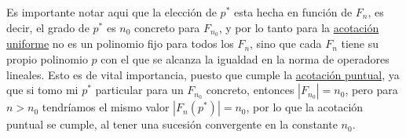 \begin{ejercicio}
    \noindent
    Es importante notar aqui que la elección de $p^*$ esta hecha en función de $F_n$, es decir, el grado de $p^*$ es $n_0$ concreto para $F_{n_0}$, y por lo tanto para la \underline{acotación uniforme} no es un polinomio fijo para todos los $F_n$, sino que cada $F_n$ tiene su propio polinomio $p$ con el que se alcanza la igualdad en la norma de operadores lineales. Esto es de vital importancia, puesto que  cumple la \underline{acotación puntual}, ya que si tomo mi $p^*$ particular para un $F_{n_0}$ concreto, entonces $|F_{n_0}|=n_0$, pero para $n>n_0$ tendríamos el mismo valor $|F_n(p^*)|=n_0$, por lo que la acotación puntual se cumple, al tener una sucesión convergente en la constante $n_0$.
\end{ejercicio}
